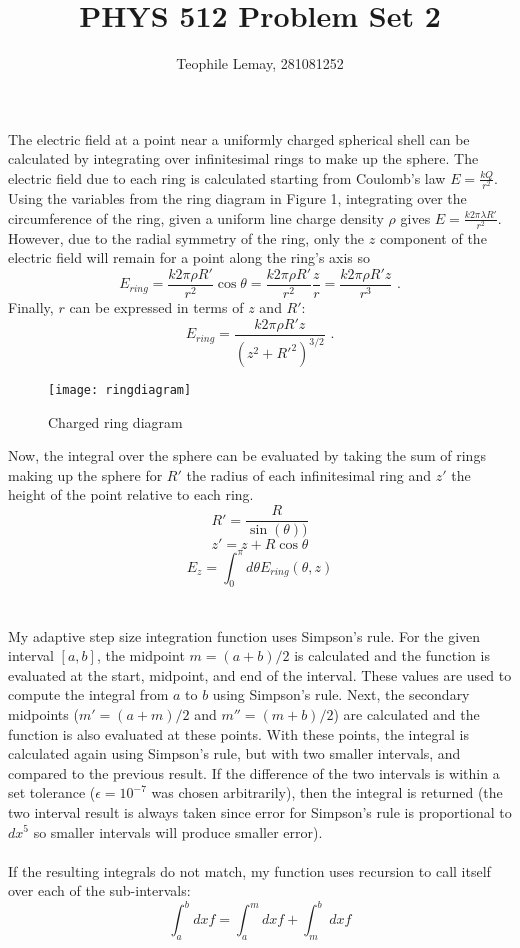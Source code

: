 \documentclass{article}
\title{PHYS 512 Problem Set 2}
\author{Teophile Lemay, 281081252}
\date{}
\newcommand{\<}[1]{\left\langle #1 \right\rangle }
\begin{document}
	\maketitle
	
\section{}
The electric field at a point near a uniformly charged spherical shell can be calculated by integrating over infinitesimal rings to make up the sphere. The electric field due to each ring is calculated starting from Coulomb's law $E = \frac{kQ}{r^2}$. Using the variables from the ring diagram in Figure 1, integrating over the circumference of the ring, given a uniform line charge density $\rho$ gives $E = \frac{k2\pi \lambda R'}{r^2}$. However, due to the radial symmetry of the ring, only the $z$ component of the electric field will remain for a point along the ring's axis so
\[E_{ring} = \frac{k2\pi\rho R'}{r^2} \cos{\theta} = \frac{k2\pi\rho R'}{r^2}\frac{z}{r} = \frac{k2\pi\rho R'z}{r^3}\text{ .}\]
Finally, $r$ can be expressed in terms of $z$ and $R'$:
\[E_{ring} = \frac{k2\pi\rho R'z}{\left(z^2 + R'^2\right)^{3/2}} \text{ .}\]
\begin{figure}[h]
	\caption{Charged ring diagram}
	\centering
	\texttt{[image: ringdiagram]}
\end{figure}
Now, the integral over the sphere can be evaluated by taking the sum of rings making up the sphere for $R'$ the radius of each infinitesimal ring and $z'$ the height of the point relative to each ring.
\[R' = \frac{R}{\sin(\theta))} \]
\[z' = z + R\cos\theta\]
\[E_z = \int_{0}^{\pi}  d\theta E_{ring}(\theta, z)\]

\section{}
My adaptive step size integration function uses Simpson's rule. For the given interval $[a, b]$, the midpoint $m = (a+b)/2$ is calculated and the function is evaluated at the start, midpoint, and end of the interval. These values are used to compute the integral from $a$ to $b$ using Simpson's rule. Next, the secondary midpoints ($m' = (a+m)/2$ and $m'' = (m+b)/2$) are calculated and the function is also evaluated at these points. With these points, the integral is calculated again using Simpson's rule, but with two smaller intervals, and compared to the previous result. If the difference of the two intervals is within a set tolerance ($\epsilon = 10^{-7}$ was chosen arbitrarily), then the integral is returned (the two interval result is always taken since error for Simpson's rule is proportional to $dx^5$ so smaller intervals will produce smaller error).\\
\\
If the resulting integrals do not match, my function uses recursion to call itself over each of the sub-intervals:
\[\int_a^b dx f = \int_a^m dx f + \int_m^b dx f \]
 

\section{}
\end{document}
